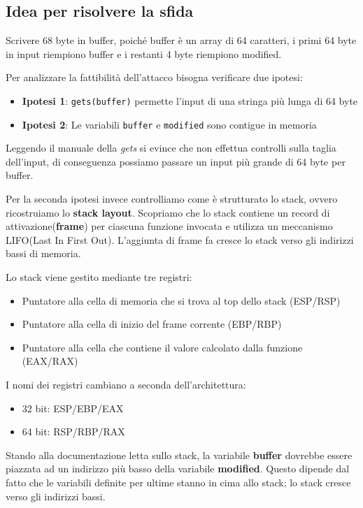 \subsection{Idea per risolvere la sfida}
Scrivere 68 byte in buffer, poiché buffer è un array di 64 caratteri, i primi 64 byte in input riempiono buffer e i restanti 4 byte riempiono modified.

Per analizzare la fattibilità dell'attacco bisogna verificare due ipotesi:
    \begin{itemize}
        \item \textbf{Ipotesi 1}: \texttt{gets(buffer)} permette l'input di una stringa più lunga di 64 byte
        \item \textbf{Ipotesi 2}: Le variabili \texttt{buffer} e \texttt{modified} sono contigue in memoria
    \end{itemize}
Leggendo il manuale della \textit{gets} si evince che non effettua controlli sulla taglia dell'input, di conseguenza possiamo passare un input più grande di 64 byte per buffer.

Per la seconda ipotesi invece controlliamo come è strutturato lo stack, ovvero ricostruiamo lo \textbf{stack layout}. Scopriamo che lo stack contiene un record di attivazione(\textbf{frame}) per ciascuna funzione invocata e utilizza un meccanismo LIFO(Last In First Out). L'aggiunta di frame fa cresce lo stack verso gli indirizzi bassi di memoria. 

Lo stack viene gestito mediante tre registri:
\begin{itemize}
    \item Puntatore alla cella di memoria che si trova al top dello stack (ESP/RSP)
    \item Puntatore alla cella di inizio del frame corrente (EBP/RBP)
    \item Puntatore alla cella che contiene il valore calcolato dalla funzione (EAX/RAX)
\end{itemize}
I nomi dei registri cambiano a seconda dell'architettura:
\begin{itemize}
    \item 32 bit: ESP/EBP/EAX
    \item 64 bit: RSP/RBP/RAX
\end{itemize}
Stando alla documentazione letta sullo stack, la variabile \textbf{buffer} dovrebbe essere piazzata ad un indirizzo più basso della variabile \textbf{modified}. Questo dipende dal fatto che le variabili definite per ultime stanno in cima allo stack; lo stack cresce verso gli indirizzi bassi.

